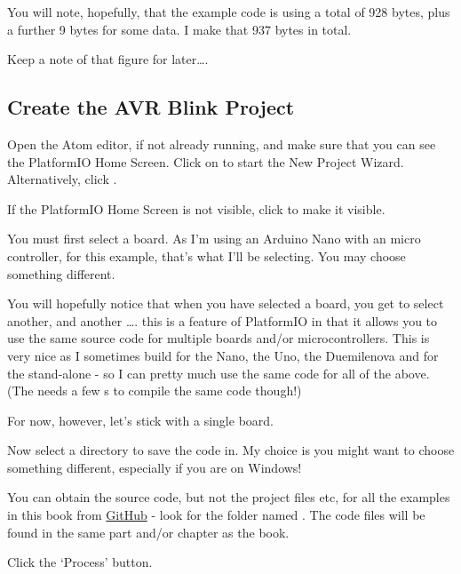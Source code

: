 You will note, hopefully, that the example code is using a total of 928 bytes, plus a further 9 bytes for some data. I make that 937 bytes in total.

Keep a note of that figure for later\ldots{}.

\subsection{Create the AVR Blink Project}\label{create-the-avr-blink-project}

Open the Atom editor, if not already running, and make sure that you can see the PlatformIO Home Screen. Click on  to start the New Project Wizard. Alternatively, click .

If the PlatformIO Home Screen is not visible, click  to make it visible.

You must first select a board. As I'm using an Arduino Nano with an  micro controller, for this example, that's what I'll be selecting. You may choose something different.

You will hopefully notice that when you have selected a board, you get to select another, and another \ldots{}. this is a feature of PlatformIO in that it allows you to use the same source code for multiple boards and/or microcontrollers. This is very nice as I sometimes build for the Nano, the Uno, the Duemilenova and for the stand-alone  - so I can pretty much use the same code for all of the above. (The  needs a few s to compile the same code though!)

For now, however, let's stick with a single board.

Now select a directory to save the code in. My choice is  you might want to choose something different, especially if you are on Windows!

\begin{note}
You can obtain the source code, but not the  project files etc, for all the examples in this book from \href{https://github.com/NormanDunbar/AVRBook}{GitHub} - look for the folder named . The code files will be found in the same part and/or chapter as the book.
\end{note}

Click the `Process' button.

